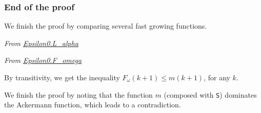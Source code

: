 \subsubsection{End of the proof}

We finish the proof by comparing several fast growing functions.

\vspace{4pt}

\emph{From \href{../theories/html/hydras.Epsilon0.L_alpha.html}{Epsilon0.L\_alpha}}



\vspace{4pt}

\emph{From \href{../theories/html/hydras.Epsilon0.F_omega.html}{Epsilon0.F\_omega}}


\vspace{4pt}

By transitivity, we get the inequality
$F_\omega(k+1)\leq m(k+1)$, for any $k$.




We finish the proof by noting that the function $m$ (composed with \texttt{S}) dominates the Ackermann function, which leads to a contradiction.





\vspace{4pt}





